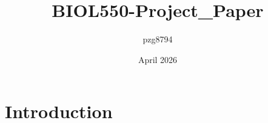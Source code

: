 \documentclass{article}
\title{BIOL550-Project_Paper}
\author{pzg8794 }
\date{April 2026}
\begin{document}
\maketitle

\section{Introduction}
\end{document}
